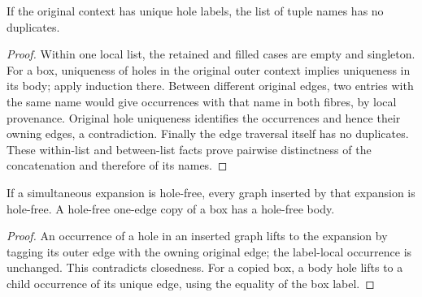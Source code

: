 \begin{theorem}
If the original context has unique hole labels, the list of tuple names has
no duplicates.
\end{theorem}
\begin{proof}
Within one local list, the retained and filled cases are empty and singleton.
For a box, uniqueness of holes in the original outer context implies
uniqueness in its body; apply induction there. Between different original
edges, two entries with the same name would give occurrences with that name
in both fibres, by local provenance. Original hole uniqueness identifies the
occurrences and hence their owning edges, a contradiction. Finally the edge
traversal itself has no duplicates. These within-list and between-list facts
prove pairwise distinctness of the concatenation and therefore of its names.
\end{proof}

\begin{lemma}
If a simultaneous expansion is hole-free, every graph inserted by that
expansion is hole-free. A hole-free one-edge copy of a box has a hole-free body.
\end{lemma}
\begin{proof}
An occurrence of a hole in an inserted graph lifts to the expansion by tagging
its outer edge with the owning original edge; the label-local occurrence is
unchanged. This contradicts closedness. For a copied box, a body hole lifts to
a child occurrence of its unique edge, using the equality of the box label.
\end{proof}

